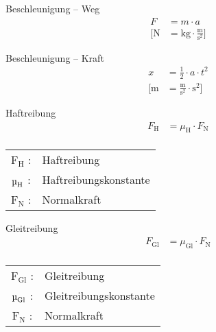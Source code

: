 %


\begin{karte}{Beschleunigung -- Weg}
    \begin{align*}
        F &= m \cdot a \\
        [\text{N} &= \text{kg} \cdot 
            \frac{\text{m}}{\text{s}^2}
        ]
    \end{align*}
\end{karte}

\begin{karte}{Beschleunigung -- Kraft}
    \begin{align*}
        x &= \frac{1}{2} \cdot a \cdot t^2 \\
        [
            \text{m} &=
            \frac{\text{m}}{\text{s}^2}
            \cdot \text{s}^2 ]
    \end{align*}
\end{karte}

\begin{karte}{Haftreibung}
    \begin{align*}
        F_\text{H} &= \mu_\text{H} \cdot F_\text{N} \\
    \end{align*}
    \begin{center}
    \begin{tabular}[t]{cl}
        \(\text{F}_\text{H}\) :& Haftreibung\\
        \(\text{\textmu}_\text{H}\) :& Haftreibungskonstante \\
        \(\text{F}_\text{N}\) :& Normalkraft \\
    \end{tabular}
    \end{center}
\end{karte}

\begin{karte}{Gleitreibung}
    \begin{align*}
        F_\text{Gl} &= \mu_\text{Gl} \cdot F_\text{N} \\
    \end{align*}
    \begin{center}
    \begin{tabular}[t]{cl}
        \(\text{F}_\text{Gl}\) :& Gleitreibung\\
        \(\text{\textmu}_\text{Gl}\) :& Gleitreibungskonstante \\
        \(\text{F}_\text{N}\) :& Normalkraft \\
    \end{tabular}
    \end{center}
\end{karte}

